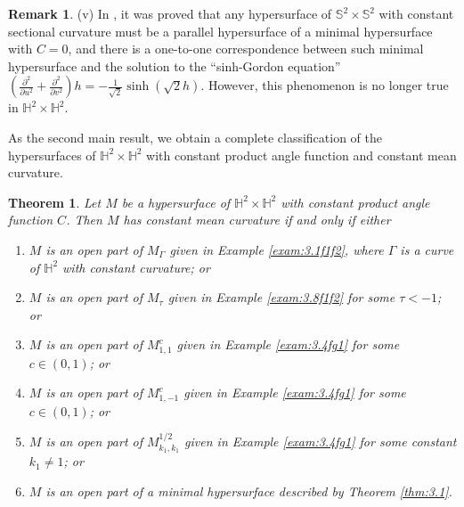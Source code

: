 \documentclass[reqno]{amsart}%
\newtheorem{theorem}{Theorem}[section]   %
\theoremstyle{definition}
\newtheorem{remark}{Remark}[section]
\numberwithin{equation}{section}
\begin{document}
\begin{remark}
(v) In \cite{LVWY}, it was proved that any hypersurface of $\mathbb{S}^2\times\mathbb{S}^2$
with constant sectional curvature must be a parallel hypersurface of a minimal hypersurface with $C=0$, and there is 
a one-to-one correspondence between such minimal hypersurface and the solution to the
``sinh-Gordon equation''
$
(\frac{\partial^2}{\partial u^2}+\frac{\partial^2}{\partial v^2})h
=-\tfrac{1}{\sqrt{2}}\sinh(\sqrt{2}h).
$
However, this phenomenon is no longer true in $\mathbb{H}^2\times\mathbb{H}^2$. 



\end{remark}

As the second main result, we obtain a complete classification of
the hypersurfaces of $\mathbb{H}^2\times\mathbb{H}^2$
with constant product angle function and constant mean curvature.
\begin{theorem}\label{thm:1.2}
Let $M$ be a hypersurface of $\mathbb{H}^2\times \mathbb{H}^2$ with constant product angle function $C$. Then
$M$ has constant mean curvature if and only if either
%
\begin{enumerate}
\item[(1)]
$M$ is an open part of $M_\Gamma$ given in Example \ref{exam:3.1f1f2}, where $\Gamma$ is a curve of $\mathbb{H}^2$ with constant curvature; or

\item[(2)]
$M$ is an open part of $M_\tau$ given in Example \ref{exam:3.8f1f2} for some $\tau<-1$; or

\item[(3)]
$M$ is an open part of $M_{1,1}^c$ given in Example \ref{exam:3.4fg1} for some $c\in(0,1)$; or

\item[(4)]
$M$ is an open part of $M_{1,-1}^c$ given in Example \ref{exam:3.4fg1} for some $c\in(0,1)$; or


\item[(5)]
$M$ is an open part of $M_{k_1,k_1}^{1/2}$ given in Example \ref{exam:3.4fg1} for some constant $k_1\neq1$; or

\item[(6)]
$M$ is an open part of a minimal hypersurface described by Theorem \ref{thm:3.1}.
\end{enumerate}
\end{theorem}
\end{document}
